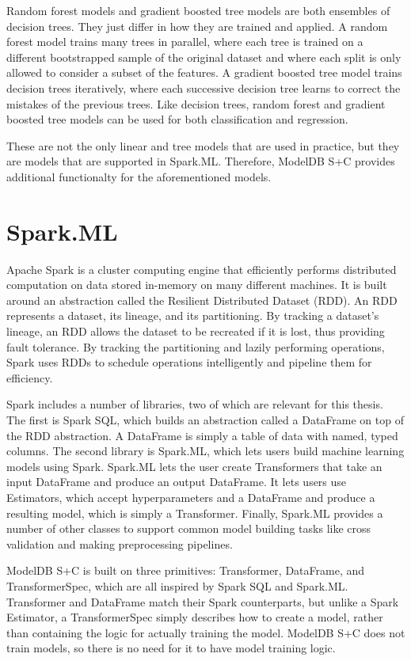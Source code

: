 Random forest models and gradient boosted tree models are both ensembles of decision trees. They just differ in how they
are trained and applied. A random forest model trains many trees in parallel, where each tree is trained on a different bootstrapped
sample of the original dataset and where each split is only allowed to consider a subset of the features. A gradient boosted tree model
trains decision trees iteratively, where each successive decision tree learns to correct the mistakes of the previous trees. Like decision
trees, random forest and gradient boosted tree models can be used for both classification and regression. \cite{introtostatlearn}

These are not the only linear and tree models that are used in practice, but they are models that are supported in Spark.ML. 
Therefore, ModelDB S+C provides additional functionalty for the aforementioned models.

\section{Spark.ML}
Apache Spark \cite{spark} is a cluster computing engine that efficiently performs distributed computation
on data stored in-memory on many different machines. It is built around 
an abstraction called the Resilient Distributed Dataset (RDD). An RDD represents a dataset, its lineage,
and its partitioning. By tracking a dataset's lineage, an RDD allows the dataset to be recreated if it is
lost, thus providing fault tolerance. By tracking the partitioning and lazily performing operations, Spark
uses RDDs to schedule operations intelligently and pipeline them for efficiency.

Spark includes a number of libraries, two of which are relevant for this thesis. The first is Spark SQL,
which builds an abstraction called a DataFrame on top of the RDD abstraction. A DataFrame is simply a table
of data with named, typed columns. The second library
is Spark.ML, which lets users build machine learning models using Spark. Spark.ML lets the user create Transformers
that take an input DataFrame and produce an output DataFrame. It lets users use Estimators, which accept hyperparameters
and a DataFrame and produce a resulting model, which is simply a Transformer. Finally, Spark.ML provides a number
of other classes to support common model building tasks like cross validation and making preprocessing pipelines.

ModelDB S+C is built on three primitives: Transformer, DataFrame, and TransformerSpec, which are all inspired
by Spark SQL and Spark.ML. Transformer and DataFrame match their Spark counterparts, but unlike a Spark Estimator, a 
TransformerSpec simply describes how to create a model, rather than containing the logic for actually training the model.
ModelDB S+C does not train models, so there is no need for it to have model training logic.

